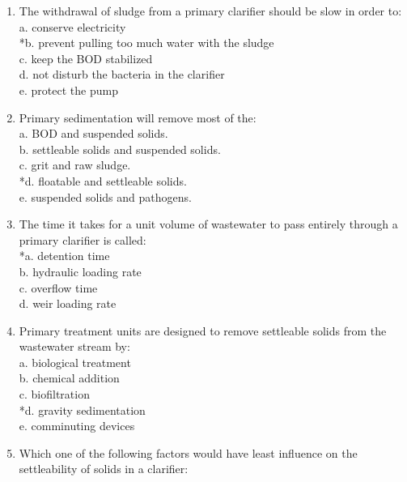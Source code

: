 \begin{enumerate}
\item  The withdrawal of sludge from a primary clarifier should be slow in order to: \\

a. conserve electricity \\
*b. prevent pulling too much water with the sludge \\
c. keep the BOD stabilized \\
d. not disturb the bacteria in the clarifier \\
e. protect the pump \\


\item  Primary sedimentation will remove most of the: \\

a. BOD and suspended solids. \\
b. settleable solids and suspended solids. \\
c. grit and raw sludge. \\
*d. floatable and settleable solids. \\
e. suspended solids and pathogens. \\


\item  The time it takes for a unit volume of wastewater to pass entirely through a primary clarifier is called: \\

*a. detention time \\
b. hydraulic loading rate \\
c. overflow time \\
d. weir loading rate \\


\item  Primary treatment units are designed to remove settleable solids from the wastewater stream by: \\

a. biological treatment \\
b. chemical addition \\
c. biofiltration \\
*d. gravity sedimentation \\
e. comminuting devices \\


\item  Which one of the following factors would have least influence on the settleability of solids in a clarifier: \\


\end{enumerate}
